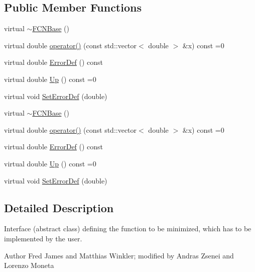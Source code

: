 \subsection*{Public Member Functions}
\begin{DoxyCompactItemize}
\item 
virtual \mbox{\hyperlink{classROOT_1_1Minuit2_1_1FCNBase_a2b80638970a23652d21c5f840c3979fa}{$\sim$\+F\+C\+N\+Base}} ()
\item 
virtual double \mbox{\hyperlink{classROOT_1_1Minuit2_1_1FCNBase_ae4a86bd94d0d0f5ca6fc8f8ab2bb43cd}{operator()}} (const std\+::vector$<$ double $>$ \&x) const =0
\item 
virtual double \mbox{\hyperlink{classROOT_1_1Minuit2_1_1FCNBase_ac4592475c58a65b037ba97ab5f3cba10}{Error\+Def}} () const
\item 
virtual double \mbox{\hyperlink{classROOT_1_1Minuit2_1_1FCNBase_a04ef08ddad92ce8d89d498efbe021c39}{Up}} () const =0
\item 
virtual void \mbox{\hyperlink{classROOT_1_1Minuit2_1_1FCNBase_a840e02c2e6ef96eec289deca096b6088}{Set\+Error\+Def}} (double)
\item 
virtual \mbox{\hyperlink{classROOT_1_1Minuit2_1_1FCNBase_a2b80638970a23652d21c5f840c3979fa}{$\sim$\+F\+C\+N\+Base}} ()
\item 
virtual double \mbox{\hyperlink{classROOT_1_1Minuit2_1_1FCNBase_ae4a86bd94d0d0f5ca6fc8f8ab2bb43cd}{operator()}} (const std\+::vector$<$ double $>$ \&x) const =0
\item 
virtual double \mbox{\hyperlink{classROOT_1_1Minuit2_1_1FCNBase_ac4592475c58a65b037ba97ab5f3cba10}{Error\+Def}} () const
\item 
virtual double \mbox{\hyperlink{classROOT_1_1Minuit2_1_1FCNBase_a04ef08ddad92ce8d89d498efbe021c39}{Up}} () const =0
\item 
virtual void \mbox{\hyperlink{classROOT_1_1Minuit2_1_1FCNBase_a840e02c2e6ef96eec289deca096b6088}{Set\+Error\+Def}} (double)
\end{DoxyCompactItemize}


\subsection{Detailed Description}
Interface (abstract class) defining the function to be minimized, which has to be implemented by the user.

\begin{DoxyAuthor}{Author}
Fred James and Matthias Winkler; modified by Andras Zsenei and Lorenzo Moneta 
\end{DoxyAuthor}


